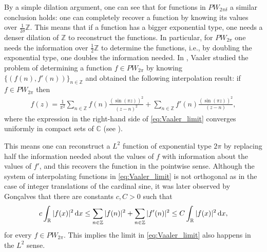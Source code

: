 \documentclass[reqno]{amsart}
\theoremstyle{plain}
\theoremstyle{definition}
\numberwithin{equation}{section}
\newcommand{\Z}{{\mathbb Z}}
\newcommand{\R}{{\mathbb R}}
\newcommand{\C}{{\mathbb C}}
\newcommand{\dx}{\, \mathrm{d}x}
\renewcommand{\dx}{\,\text{\rm d}x}
\begin{document}
By a simple dilation argument, one can see that for functions in $PW_{2\pi\delta}$ a similar conclusion holds: one can completely recover a function by knowing its values over $\tfrac{1}{2\delta}\Z$. This means that if a function has a bigger exponential type, one needs a denser dilation of $\Z$ to reconstruct the functions. In particular, for $PW_{2\pi}$ one needs the information over $\tfrac{1}{2}\Z$ to determine the functions, i.e., by doubling the exponential type, one doubles the information needed. In \cite{Va1985}, Vaaler studied the problem of determining a function $f\in PW_{2\pi}$ by knowing $\{(f(n),f'(n))\}_{n\in\Z}$ and obtained the following interpolation result: 
if $f\in PW_{2\pi}$ then 
\begin{align}\label{eq:Vaaler_limit}
    f(z)=\frac{1}{\pi^2}\sum_{n\in\Z}f(n)\frac{(\sin(\pi z))^2}{(z-n)^2}+\sum_{n\in\Z}f'(n)\frac{(\sin(\pi z))^2 }{(z-n)},
\end{align}
where the expression in the right-hand side of \eqref{eq:Vaaler_limit} converges uniformly in compact sets of $\C$ (see \cite[Theorem 9]{Va1985}).


This means one can reconstruct a $L^2$ function of exponential type $2\pi$ by replacing half the information needed about the values of $f$ with information about the values of $f'$, and this recovers the function in the pointwise sense. Although the system of interpolating functions in \eqref{eq:Vaaler_limit} is not orthogonal as in the  case of integer translations of the cardinal sine, it was later observed by Gonçalves \cite[Corollary 2]{G2015} that there are constants $c,C>0$ such that
\begin{align}\label{eq:12/07/2018 14:20}
    c\int_\R |f(x)|^2\dx \leq\sum_{n\in\Z}|f(n)|^2+\sum_{n\in\Z}|f'(n)|^2 \leq C\int_\R |f(x)|^2\dx,
\end{align}
for every $f\in PW_{2\pi}$. This implies the limit in \eqref{eq:Vaaler_limit} also happens in the $L^2$ sense.
\end{document}
